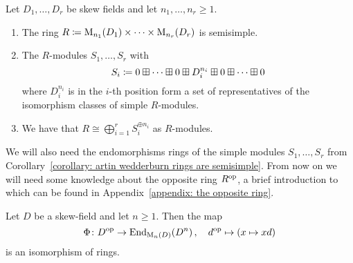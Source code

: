 \begin{corollary}
  \label{corollary: artin wedderburn rings are semisimple}
  Let $D_1, \dotsc, D_r$ be skew fields and let $n_1, \dotsc, n_r \geq 1$.
  \begin{enumerate}
    \item
      The ring $R \coloneqq  \operatorname{M}_{n_1}(D_1) \times \dotsb \times  \operatorname{M}_{n_r}(D_r)$ is semisimple.
    \item
      The $R$-modules $S_1, \dotsc, S_r$ with
      \[
                  S_i
        \coloneqq  0 \boxplus \dotsb \boxplus 0 \boxplus D_i^{n_i} \boxplus 0 \boxplus \dotsb \boxplus 0
      \]
      where $D_i^{n_i}$ is in the $i$-th position form a set of representatives of the isomorphism classes of simple $R$-modules.
    \item
      We have that $R \cong \bigoplus_{i=1}^r S_i^{\oplus n_i}$ as $R$-modules.
  \end{enumerate}
\end{corollary}


\begin{fluff}
  We will also need the endomorphisms rings of the simple modules $S_1, \dotsc, S_r$ from Corollary~\ref{corollary: artin wedderburn rings are semisimple}.
  From now on we will need some knowledge about the opposite ring $R^{\operatorname{op}}$, a brief introduction to which can be found in Appendix~\ref{appendix: the opposite ring}.
\end{fluff}


\begin{lemma}
  \label{lemma: matrix vector space correspondence for skew fields}
  Let $D$ be a skew-field and let $n \geq 1$.
  Then the map
  \[
            \Phi 
    \colon  D^{\operatorname{op}}
    \to     \operatorname{End}_{\operatorname{M}_n(D)}(D^n) \,,
    \quad   d^{\operatorname{op}}
    \mapsto (x \mapsto xd)
  \]
  is an isomorphism of rings.
\end{lemma}


